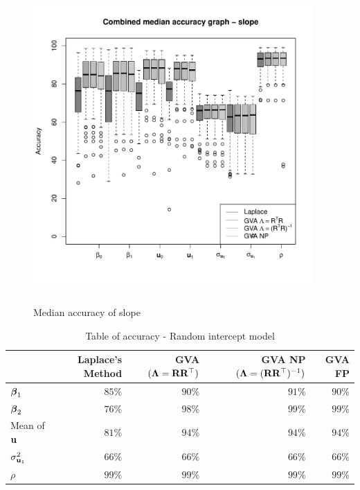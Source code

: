 			\begin{figure}
				\includegraphics[width=0.95\textwidth, height=120mm]{code/results/median_accuracy_combined_slope.pdf}
				\caption{Median accuracy of slope}
				\label{fig:median_accuracy_slope}
			\end{figure}
					
			\begin{table}
				\caption{Table of accuracy - Random intercept model}
				\label{tab:accuracy_int}
				\begin{tabular}{|l|rrrr|}
					\hline
					                   & Laplace's Method & GVA $({\boldsymbol \Lambda} = {\bf R} {\bf R}^\top)$ & GVA NP $({\boldsymbol \Lambda} = ({\bf R} {\bf R}^\top)^{-1})$ & GVA FP \\
					\hline
					${\boldsymbol \beta}_1$         & $85\%$           & $90\%$                          & $91\%$                                    & $90\%$ \\ 
					${\boldsymbol \beta}_2$         & $76\%$           & $98\%$                          & $99\%$                                    & $99\%$ \\ 
					Mean of ${\bf u}$      & $81\%$           & $94\%$                          & $94\%$                                    & $94\%$ \\
					$\sigma^2_{{\bf u}_1}$ & $66\%$           & $66\%$                          & $66\%$                                    & $66\%$ \\ 
					$\rho$             & $99\%$           & $99\%$                          & $99\%$                                    & $99\%$ \\ 
					\hline
				\end{tabular}
			\end{table}
					
